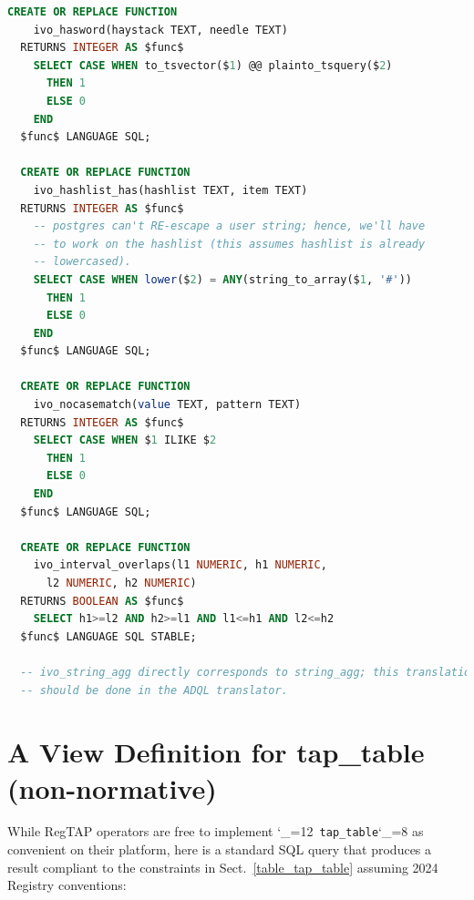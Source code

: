 \documentclass[11pt,a4paper]{ivoa}
\makeatletter
\def\rtent#1{\texttt{\color{rtcolor}\verb|#1|}}
\def\makeunderscoreletter{\catcode`\_=12}
\def\makeunderscoresubscript{\catcode`\_=8}
\def\rtent{\makeunderscoreletter\relax\rt@nt}
\def\rt@nt#1{\texttt{\color{rtcolor} #1}\makeunderscoresubscript{}}
\makeatother
\begin{document}
\begin{lstlisting}[language=SQL,basicstyle=\footnotesize]
  CREATE OR REPLACE FUNCTION
    ivo_hasword(haystack TEXT, needle TEXT)
  RETURNS INTEGER AS $func$
    SELECT CASE WHEN to_tsvector($1) @@ plainto_tsquery($2)
      THEN 1
      ELSE 0
    END
  $func$ LANGUAGE SQL;

  CREATE OR REPLACE FUNCTION
    ivo_hashlist_has(hashlist TEXT, item TEXT)
  RETURNS INTEGER AS $func$
    -- postgres can't RE-escape a user string; hence, we'll have
    -- to work on the hashlist (this assumes hashlist is already
    -- lowercased).
    SELECT CASE WHEN lower($2) = ANY(string_to_array($1, '#'))
      THEN 1
      ELSE 0
    END
  $func$ LANGUAGE SQL;

  CREATE OR REPLACE FUNCTION
    ivo_nocasematch(value TEXT, pattern TEXT)
  RETURNS INTEGER AS $func$
    SELECT CASE WHEN $1 ILIKE $2
      THEN 1
      ELSE 0
    END
  $func$ LANGUAGE SQL;

  CREATE OR REPLACE FUNCTION
    ivo_interval_overlaps(l1 NUMERIC, h1 NUMERIC,
      l2 NUMERIC, h2 NUMERIC)
  RETURNS BOOLEAN AS $func$
    SELECT h1>=l2 AND h2>=l1 AND l1<=h1 AND l2<=h2
  $func$ LANGUAGE SQL STABLE;

  -- ivo_string_agg directly corresponds to string_agg; this translation
  -- should be done in the ADQL translator.
\end{lstlisting}

\section{A View Definition for tap\_table (non-normative)}
\label{app:tap-table-viewdef}

While RegTAP operators are free to implement \rtent{tap_table} as
convenient on their platform, here is a standard SQL query that produces
a result compliant to the constraints in Sect.~\ref{table_tap_table}
assuming 2024 Registry conventions:
\end{document}
